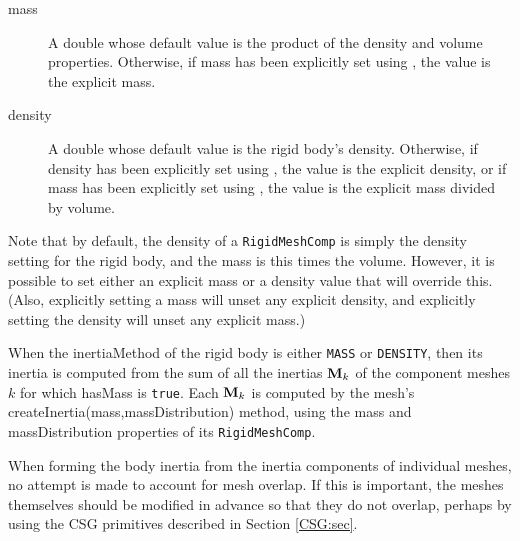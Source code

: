 \begin{description}
\item[mass]\mbox{} 

A double whose default value is the product of the {\sf
density} and {\sf volume} properties. Otherwise,
if {\sf mass} has been explicitly set using
,
the value is the explicit mass.

\item[density]\mbox{}

A double whose default value is the rigid body's
density.  Otherwise, if {\sf density} has been explicitly set using
,
the value is the explicit density, or if {\sf mass} has been explicitly
set using
, the
value is the explicit {\sf mass} divided by {\sf volume}.

\end{description}

Note that by default, the {\sf density} of a {\tt RigidMeshComp} is
simply the {\sf density} setting for the rigid body, and the {\sf
mass} is this times the {\sf volume}. However, it is possible to set
either an explicit mass or a density value that will override
this. (Also, explicitly setting a mass will unset any explicit
density, and explicitly setting the density will unset any explicit
mass.)

When the {\sf inertiaMethod} of the rigid body is either {\tt MASS} or
{\tt DENSITY}, then its inertia is computed from the sum of all the
inertias ${\bf M}_k$ of the component meshes $k$ for which {\sf hasMass} is
{\tt true}. Each ${\bf M}_k$ is computed by the mesh's
%
{createInertia(mass,massDistribution)} method,
using the {\sf mass} and {\sf massDistribution} properties of
its {\tt RigidMeshComp}.

\begin{sideblock}
When forming the body inertia from the inertia components of
individual meshes, no attempt is made to account for mesh overlap.  If
this is important, the meshes themselves should be modified in advance
so that they do not overlap, perhaps by using the CSG primitives
described in Section \ref{CSG:sec}.
\end{sideblock}

